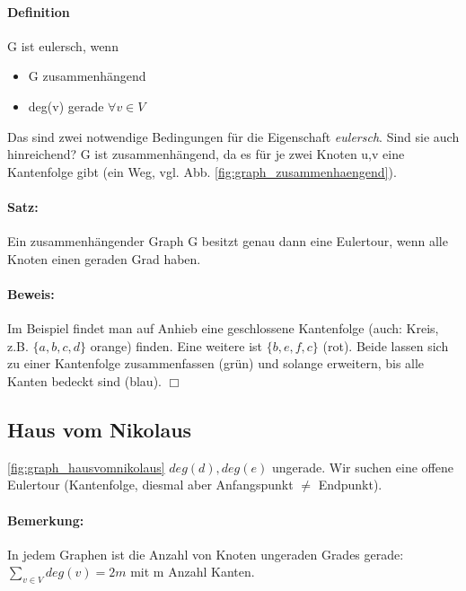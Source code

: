 \paragraph{Definition} G ist eulersch, wenn
\begin{itemize}
\item G zusammenhängend
\item deg(v) gerade $\forall v \in V$
\end{itemize}
Das sind zwei notwendige Bedingungen für die Eigenschaft \textit{eulersch}. Sind sie auch hinreichend? G ist zusammenhängend, da es für je zwei Knoten u,v eine Kantenfolge gibt (ein Weg, vgl. Abb. \ref{fig:graph_zusammenhaengend}). 




\paragraph{Satz:} Ein zusammenhängender Graph G besitzt genau dann eine Eulertour, wenn alle Knoten einen geraden Grad haben. 

\paragraph{Beweis:} Im Beispiel findet man auf Anhieb eine geschlossene Kantenfolge (auch: Kreis, z.B. $\{a,b,c,d\}$ orange) finden. Eine weitere ist $\{b,e,f,c\}$ (rot). Beide lassen sich zu einer Kantenfolge zusammenfassen (grün) und solange erweitern, bis alle Kanten bedeckt sind (blau). $\Box$




\subsection{Haus vom Nikolaus} \ref{fig:graph_hausvomnikolaus} $deg(d), deg(e)$ ungerade. Wir suchen eine offene Eulertour (Kantenfolge, diesmal aber Anfangspunkt $\neq$ Endpunkt). 




\paragraph{Bemerkung:} In jedem Graphen ist die Anzahl von Knoten ungeraden Grades gerade: $\sum_{v \in V} deg(v) = 2 m$ mit m Anzahl Kanten. 

